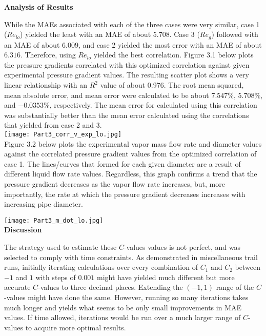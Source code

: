 \documentclass[10pt]{article}
\begin{document}
\textbf{Analysis of Results}

While the MAEs associated with each of the three cases were very similar, case 1 (\(Re_{lo}\)) yielded the least with an MAE of about \(5.708\). Case 3 (\(Re_g\)) followed with an MAE of about \(6.009\), and case 2 yielded the most error with an MAE of about \(6.316\). Therefore, using \(Re_{lo}\) yielded the best correlation. Figure 3.1 below plots the pressure gradients correlated with this optimized correlation against given experimental pressure gradient values. The resulting scatter plot shows a very linear relationship with an \(R^2\) value of about 0.976. The root mean squared, mean absolute error, and mean error were calculated to be about \(7.547\%\), \(5.708\%\), and \(-0.0353\%\), respectively. The mean error for calculated using this correlation was substantially better than the mean error calculated using the correlations that yielded from case 2 and 3.\\

\texttt{[image: Part3\_corr\_v\_exp\_lo.jpg]}\\

Figure 3.2 below plots the experimental vapor mass flow rate and diameter values against the correlated pressure gradient values from the optimized correlation of case 1. The lines/curves that formed for each given diameter are a result of different liquid flow rate values. Regardless, this graph confirms a trend that the pressure gradient decreases as the vapor flow rate increases, but, more importantly, the rate at which the pressure gradient decreases increases with increasing pipe diameter.

\texttt{[image: Part3\_m\_dot\_lo.jpg]}\\

\textbf{Discussion}

The strategy used to estimate these \(C\)-values values is not perfect, and was selected to comply with time constraints. As demonstrated in miscellaneous trail runs, initially iterating calculations over every combination of \(C_1\) and \(C_2\) between \(-1\) and \(1\) with steps of \(0.001\) might have yielded much different but more accurate \(C\)-values to three decimal places. Extending the \((-1,1)\) range of the \(C\)-values might have done the same. However, running so many iterations takes much longer and yields what seems to be only small improvements in MAE values. If time allowed, iterations would be run over a much larger range of \(C\)-values to acquire more optimal results. 
\end{document}
